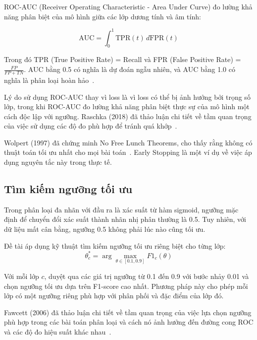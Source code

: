 \documentclass[../BTL.tex]{subfiles}
\begin{document}
ROC-AUC (Receiver Operating Characteristic - Area Under Curve) đo lường khả năng phân biệt của mô hình giữa các lớp dương tính và âm tính:

\begin{equation}
    \text{AUC} = \int_0^1 \text{TPR}(t) \, d\text{FPR}(t)
\end{equation}

Trong đó TPR (True Positive Rate) = Recall và FPR (False Positive Rate) = $\frac{FP}{FP + TN}$. AUC bằng 0.5 có nghĩa là dự đoán ngẫu nhiên, và AUC bằng 1.0 có nghĩa là phân loại hoàn hảo~\cite{fawcett2006introduction}.

Lý do sử dụng ROC-AUC thay vì loss là vì loss có thể bị ảnh hưởng bởi trọng số lớp, trong khi ROC-AUC đo lường khả năng phân biệt thực sự của mô hình một cách độc lập với ngưỡng. Raschka (2018) đã thảo luận chi tiết về tầm quan trọng của việc sử dụng các độ đo phù hợp để tránh quá khớp~\cite{raschka2018roc}.

{
\SetAlgoCaptionNoNumber{}
\begin{algorithm}[H]
\caption{Thuật toán Early Stopping}
\DontPrintSemicolon
{}
\end{algorithm}
}

Wolpert (1997) đã chứng minh No Free Lunch Theorems, cho thấy rằng không có thuật toán tối ưu nhất cho mọi bài toán~\cite{wolpert1997no}. Early Stopping là một ví dụ về việc áp dụng nguyên tắc này trong thực tế.

\subsection{Tìm kiếm ngưỡng tối ưu}
Trong phân loại đa nhãn với đầu ra là xác suất từ hàm sigmoid, ngưỡng mặc định để chuyển đổi xác suất thành nhãn nhị phân thường là 0.5. Tuy nhiên, với dữ liệu mất cân bằng, ngưỡng 0.5 không phải lúc nào cũng tối ưu.

Đề tài áp dụng kỹ thuật tìm kiếm ngưỡng tối ưu riêng biệt cho từng lớp:
\begin{equation}
    \theta_c^* = \arg\max_{\theta \in [0.1, 0.9]} F1_c(\theta)
\end{equation}

Với mỗi lớp $c$, duyệt qua các giá trị ngưỡng từ 0.1 đến 0.9 với bước nhảy 0.01 và chọn ngưỡng tối ưu dựa trên F1-score cao nhất. Phương pháp này cho phép mỗi lớp có một ngưỡng riêng phù hợp với phân phối và đặc điểm của lớp đó.

Fawcett (2006) đã thảo luận chi tiết về tầm quan trọng của việc lựa chọn ngưỡng phù hợp trong các bài toán phân loại và cách nó ảnh hưởng đến đường cong ROC và các độ đo hiệu suất khác nhau~\cite{fawcett2006introduction}.
\end{document}

